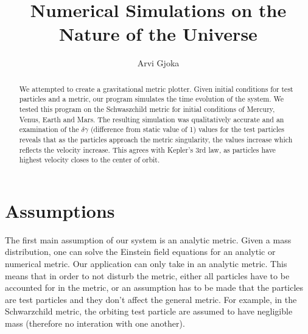 \documentclass[12pt]{article}
\title{Numerical Simulations on the Nature of the Universe}
\date{}
\author{Arvi Gjoka}
\begin{document}
\maketitle

\begin{abstract}
We attempted to create a gravitational metric plotter. Given initial conditions for test particles and a metric, our program simulates the time evolution of the system. We tested this program on the Schwaszchild metric for initial conditions of Mercury, Venus, Earth and Mars. The resulting simulation was qualitatively accurate and an examination of the $\delta \gamma$ (difference from static value of 1) values for  the test particles reveals that as the particles approach the metric singularity, the values increase which reflects the velocity increase. This agrees with Kepler's 3rd law, as particles have highest velocity closes to the center of orbit.
\end{abstract}

\section*{Assumptions}
The first main assumption of our system is an analytic metric. Given a mass distribution, one can solve the Einstein field equations for an analytic or numerical metric. Our application can only take in an analytic metric. This means that in order to not disturb the metric, either all particles have to be accounted for in the metric, or an assumption has to be made that the particles are test particles and they don't affect the general metric. For example, in the Schwarzchild metric, the orbiting test particle are assumed to have negligible mass (therefore no interation with one another).
\end{document}
